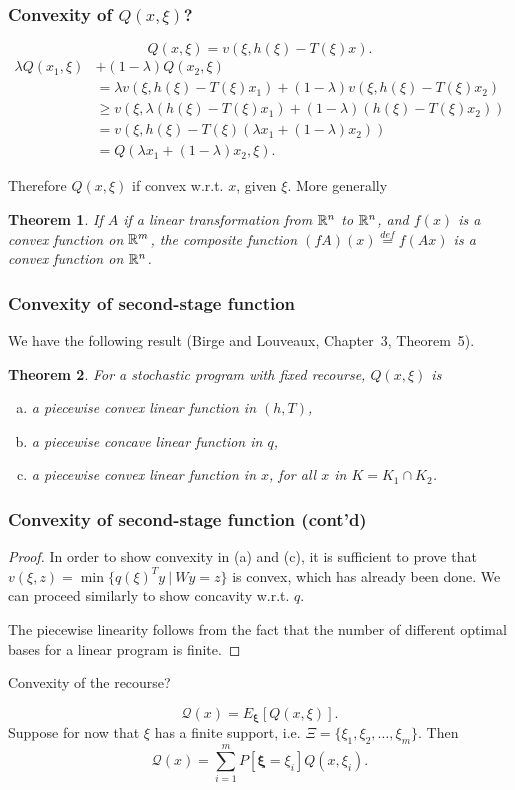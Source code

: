 \documentclass{beamer}
\newtheorem{theo}{Theorem}
\def\bxi{\boldsymbol\xi}
\def\bxi{\boldsymbol\xi}
\begin{document}
\begin{frame}
\frametitle{Convexity of $Q(x, \xi)$?}

\[
Q(x,\xi) = v(\xi, h(\xi)-T(\xi)x).
\]
\begin{align*}
\lambda Q(x_1, \xi) &+ (1-\lambda) Q(x_2, \xi) \\
&= \lambda v(\xi, h(\xi)-T(\xi)x_1) + (1-\lambda) v(\xi, h(\xi)-T(\xi)x_2) \\
&\geq v(\xi, \lambda (h(\xi)-T(\xi)x_1) + (1-\lambda)(h(\xi)-T(\xi)x_2)) \\
&= v(\xi, h(\xi)-T(\xi)(\lambda x_1 + (1-\lambda)x_2)) \\
&= Q(\lambda x_1 + (1-\lambda)x_2, \xi).
\end{align*}

Therefore {\red $Q(x, \xi)$ if convex} w.r.t. $x$, given $\xi$.
More generally
\begin{theo}
If $A$ if a linear transformation from ${\mathbb{R}}^n$ to ${\mathbb{R}}^n$, and $f(x)$ is a convex function on ${\mathbb{R}}^m$, the composite function $(fA)(x) \overset{def}{=} f(Ax)$ is a convex function on ${\mathbb{R}}^n$.
\end{theo}
\end{frame}

\begin{frame}
\frametitle{Convexity of second-stage function}

We have the following result (Birge and Louveaux, Chapter~3, Theorem~5).
\begin{theo}
For a stochastic program with fixed recourse, $Q(x,\xi)$ is
\begin{enumerate}[(a)]
\item
a piecewise convex linear function in $(h,T)$,
\item
a piecewise concave linear function in $q$,
\item
a piecewise convex linear function in $x$, for all $x$ in $K = K_1 \cap K_2$.
\end{enumerate}
\end{theo}

\end{frame}

\begin{frame}
\frametitle{Convexity of second-stage function (cont'd)}

\begin{proof}
In order to show convexity in (a) and (c), it is sufficient to prove that $v(\xi, z) = \min \lbrace q(\xi)^Ty \ |\ Wy = z \rbrace$ is convex, which has already been done.
We can proceed similarly to show concavity w.r.t. $q$.

The piecewise linearity follows from the fact that the number of different optimal bases for a linear program is finite.
\end{proof}

\mbox{}

{\red Convexity of the recourse?}

\[
\mathcal{Q}(x) = E_{\bxi} [Q(x,\xi)].
\]
Suppose for now that $\xi$ has a finite support, i.e. $\Xi = \lbrace \xi_1 ,
\xi_2,\ldots, \xi_m \rbrace$. Then
\[
\mathcal{Q}(x) = \sum_{i = 1}^{m} P[\bxi = \xi_i] Q(x,\xi_i).
\]
\end{frame}
\end{document}
